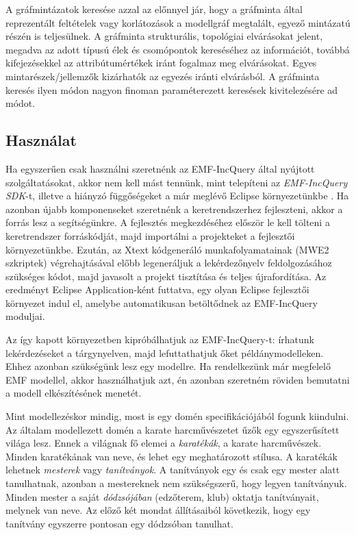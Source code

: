 A gráfmintázatok keresése azzal az előnnyel jár, hogy a gráfminta által reprezentált feltételek vagy korlátozások a modellgráf megtalált, egyező mintázatú részén is teljesülnek.
A gráfminta strukturális, topológiai elvárásokat jelent, megadva az adott típusú élek és csomópontok kereséséhez az információt, továbbá kifejezésekkel az attribútumértékek iránt fogalmaz meg elvárásokat.
Egyes mintarészek/jellemzők kizárhatók az egyezés iránti elvárásból.
A gráfminta keresés ilyen módon nagyon finoman paraméterezett keresések kivitelezésére ad módot.

\subsection{Használat}

Ha egyszerűen csak használni szeretnénk az EMF-IncQuery által nyújtott szolgáltatásokat, akkor nem kell mást tennünk, mint telepíteni az \emph{EMF-IncQuery SDK}-t, illetve a hiányzó függőségeket a már meglévő Eclipse környezetünkbe \cite{EclipseOrgIncQueryInstall}.
Ha azonban újabb komponenseket szeretnénk a keretrendszerhez fejleszteni, akkor a \cite{EclipseOrgIncQueryDevEnv} forrás lesz a segítségünkre.
A fejlesztés megkezdéséhez először le kell tölteni a keretrendszer forráskódját, majd importálni a projekteket a fejlesztői környezetünkbe.
Ezután, az Xtext kódgeneráló munkafolyamatainak (MWE2 szkriptek) végrehajtásával előbb legeneráljuk a lekérdezőnyelv feldolgozásához szükséges kódot, majd javasolt a projekt tisztítása és teljes újrafordítása.
Az eredményt Eclipse Application-ként futtatva, egy olyan Eclipse fejlesztői környezet indul el, amelybe automatikusan betöltődnek az EMF-IncQuery moduljai.

Az így kapott környezetben kipróbálhatjuk az EMF-IncQuery-t: írhatunk lekérdezéseket a tárgynyelven, majd lefuttathatjuk őket példánymodelleken.
Ehhez azonban szükségünk lesz egy modellre.
Ha rendelkezünk már megfelelő EMF modellel, akkor használhatjuk azt, én azonban szeretném röviden bemutatni a modell elkészítésének menetét.

Mint modellezéskor mindig, most is egy domén specifikációjából fogunk kiindulni.
Az általam modellezett domén a karate harcművészetet űzők egy egyszerűsített világa lesz.
Ennek a világnak fő elemei a \emph{karatékák}, a karate harcművészek.
Minden karatékának van neve, és lehet egy meghatározott stílusa.
A karatékák lehetnek \emph{mesterek} vagy \emph{tanítványok}.
A tanítványok egy és csak egy mester alatt tanulhatnak, azonban a mestereknek nem szükségszerű, hogy legyen tanítványuk.
Minden mester a saját \emph{dódzsójában} (edzőterem, klub) oktatja tanítványait, melynek van neve.
Az előző két mondat állításaiból következik, hogy egy tanítvány egyszerre pontosan egy dódzsóban tanulhat.

